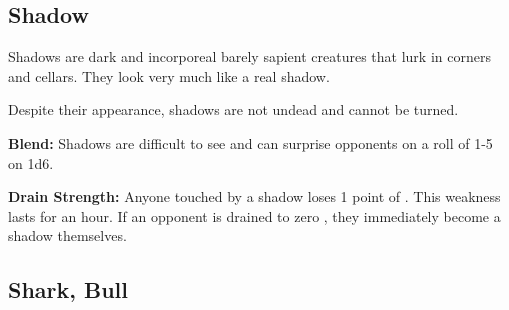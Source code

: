 \begin{multicols*}{2}
\subsection{Shadow}

Shadows are dark and incorporeal barely sapient creatures that lurk in corners and cellars. They look very much like a real shadow.

Despite their appearance, shadows are not undead and cannot be turned.

\textbf{Blend:} Shadows are difficult to see and can surprise opponents on a roll of 1-5 on 1d6.

\textbf{Drain Strength:} Anyone touched by a shadow loses 1 point of . This weakness lasts for an hour. If an opponent is drained to zero , they immediately become a shadow themselves.

\subsection{Shark, Bull}
\end{multicols*}
